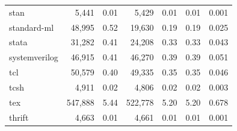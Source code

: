 \documentclass[10pt]{article} %
\begin{document}
\begin{table}[t]
{\begin{tabular}{@{\extracolsep{3pt}}lrrrrrr@{}}
stan                     & 5,441                                     & 0.01                                   & 5,429                                                  & 0.01                                                & 0.01                       & 0.001                          \\
standard-ml              & 48,995                                    & 0.52                                   & 19,630                                                 & 0.19                                                & 0.19                       & 0.025                          \\
stata                    & 31,282                                    & 0.41                                   & 24,208                                                 & 0.33                                                & 0.33                       & 0.043                          \\
systemverilog            & 46,915                                    & 0.41                                   & 46,270                                                 & 0.39                                                & 0.39                       & 0.051                          \\
tcl                      & 50,579                                    & 0.40                                   & 49,335                                                 & 0.35                                                & 0.35                       & 0.046                          \\
tcsh                     & 4,911                                     & 0.02                                   & 4,806                                                  & 0.02                                                & 0.02                       & 0.003                          \\
tex                      & 547,888                                   & 5.44                                   & 522,778                                                & 5.20                                                & 5.20                       & 0.678                          \\
thrift                   & 4,663                                     & 0.01                                   & 4,661                                                  & 0.01                                                & 0.01                       & 0.001                          \\

\end{tabular}}
\end{table}
\end{document}
